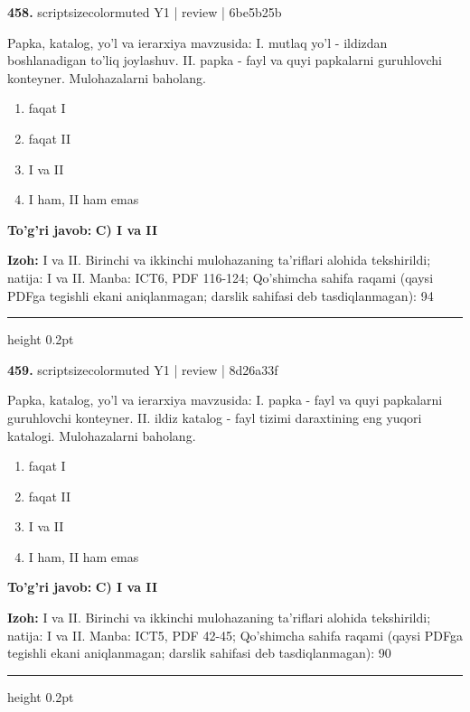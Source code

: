 \documentclass[10pt,a4paper]{article}
\begin{document}
{\bfseries\sffamily\color{ink} 458.} {scriptsizecolor{muted} Y1 | review | 6be5b25b}
\par
Papka, katalog, yo'l va ierarxiya mavzusida: I. mutlaq yo'l - ildizdan boshlanadigan to'liq joylashuv. II. papka - fayl va quyi papkalarni guruhlovchi konteyner. Mulohazalarni baholang.
\begin{enumerate}[label=\Alph*),leftmargin=9mm]
\item faqat I
\item faqat II
\item I va II
\item I ham, II ham emas
\end{enumerate}
\begin{tcolorbox}[enhanced,breakable,colback=teal!4,colframe=teal!60!black,boxrule=0.45pt,arc=1.2mm,left=2.7mm,right=2.7mm,top=1.8mm,bottom=1.8mm,before skip=2mm,after skip=2mm]
{\bfseries\sffamily\color{teal}To'g'ri javob:} \textbf{C) I va II}
\par\smallskip
{\bfseries Izoh:} I va II. Birinchi va ikkinchi mulohazaning ta'riflari alohida tekshirildi; natija: I va II. Manba: ICT6, PDF 116-124; Qo'shimcha sahifa raqami (qaysi PDFga tegishli ekani aniqlanmagan; darslik sahifasi deb tasdiqlanmagan): 94
\end{tcolorbox}
\vspace{2mm}\hrule height 0.2pt\vspace{3mm}

{\bfseries\sffamily\color{ink} 459.} {scriptsizecolor{muted} Y1 | review | 8d26a33f}
\par
Papka, katalog, yo'l va ierarxiya mavzusida: I. papka - fayl va quyi papkalarni guruhlovchi konteyner. II. ildiz katalog - fayl tizimi daraxtining eng yuqori katalogi. Mulohazalarni baholang.
\begin{enumerate}[label=\Alph*),leftmargin=9mm]
\item faqat I
\item faqat II
\item I va II
\item I ham, II ham emas
\end{enumerate}
\begin{tcolorbox}[enhanced,breakable,colback=teal!4,colframe=teal!60!black,boxrule=0.45pt,arc=1.2mm,left=2.7mm,right=2.7mm,top=1.8mm,bottom=1.8mm,before skip=2mm,after skip=2mm]
{\bfseries\sffamily\color{teal}To'g'ri javob:} \textbf{C) I va II}
\par\smallskip
{\bfseries Izoh:} I va II. Birinchi va ikkinchi mulohazaning ta'riflari alohida tekshirildi; natija: I va II. Manba: ICT5, PDF 42-45; Qo'shimcha sahifa raqami (qaysi PDFga tegishli ekani aniqlanmagan; darslik sahifasi deb tasdiqlanmagan): 90
\end{tcolorbox}
\vspace{2mm}\hrule height 0.2pt\vspace{3mm}
\end{document}
